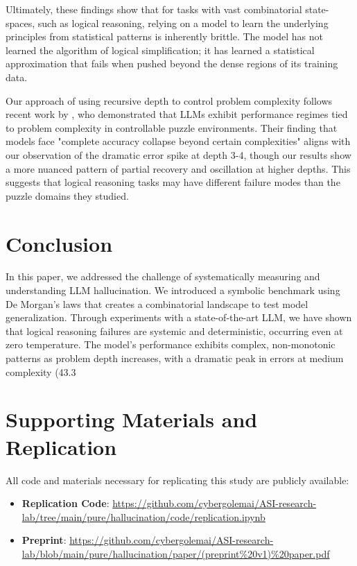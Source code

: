 \documentclass[11pt,a4paper]{article}
\begin{document}
Ultimately, these findings show that for tasks with vast combinatorial state-spaces, such as logical reasoning, relying on a model to learn the underlying principles from statistical patterns is inherently brittle. The model has not learned the algorithm of logical simplification; it has learned a statistical approximation that fails when pushed beyond the dense regions of its training data.

Our approach of using recursive depth to control problem complexity follows recent work by \citet{shojaee2025illusion}, who demonstrated that LLMs exhibit performance regimes tied to problem complexity in controllable puzzle environments. Their finding that models face "complete accuracy collapse beyond certain complexities" aligns with our observation of the dramatic error spike at depth 3-4, though our results show a more nuanced pattern of partial recovery and oscillation at higher depths. This suggests that logical reasoning tasks may have different failure modes than the puzzle domains they studied.

\section{Conclusion}
In this paper, we addressed the challenge of systematically measuring and understanding LLM hallucination. We introduced a symbolic benchmark using De Morgan's laws that creates a combinatorial landscape to test model generalization. Through experiments with a state-of-the-art LLM, we have shown that logical reasoning failures are systemic and deterministic, occurring even at zero temperature. The model's performance exhibits complex, non-monotonic patterns as problem depth increases, with a dramatic peak in errors at medium complexity (43.3%

\section{Supporting Materials and Replication}
All code and materials necessary for replicating this study are publicly available:
\begin{itemize}
    \item \textbf{Replication Code}: \url{https://github.com/cybergolemai/ASI-research-lab/tree/main/pure/hallucination/code/replication.ipynb}
    \item \textbf{Preprint}: \url{https://github.com/cybergolemai/ASI-research-lab/blob/main/pure/hallucination/paper/(preprint%20v1)%20paper.pdf}
\end{itemize}
\end{document}
